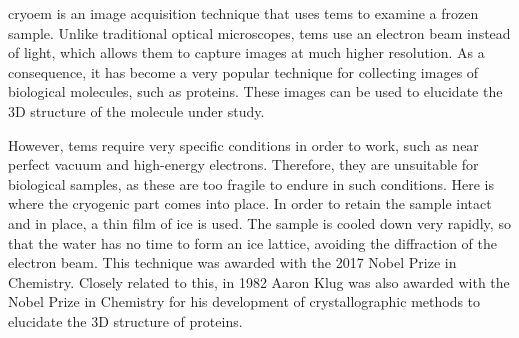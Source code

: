 \documentclass[../main.tex]{subfiles}
\begin{document}
\gls{cryoem} is an image acquisition technique that uses \glspl{tem} to examine a frozen sample. Unlike traditional optical microscopes, \glspl{tem} use an electron beam instead of light, which allows them to capture images at much higher resolution. As a consequence, it has become a very popular technique for collecting images of biological molecules, such as proteins\cite{chemistry_world_cryoem}. These images can be used to elucidate the 3D structure of the molecule under study.

However, \glspl{tem} require very specific conditions in order to work, such as near perfect vacuum and high-energy electrons. Therefore, they are unsuitable for biological samples, as these are too fragile to endure in such conditions. Here is where the cryogenic part comes into place. In order to retain the sample intact and in place, a thin film of ice is used. The sample is cooled down very rapidly, so that the water has no time to form an ice lattice, avoiding the diffraction of the electron beam. This technique was awarded with the 2017 Nobel Prize in Chemistry\cite{chemistry_world_cryoem}\cite{nobel2017}. Closely related to this, in 1982 Aaron Klug was also awarded with the Nobel Prize in Chemistry for his development of crystallographic methods to elucidate the 3D structure of proteins\cite{nobel1982}.

\end{document}
